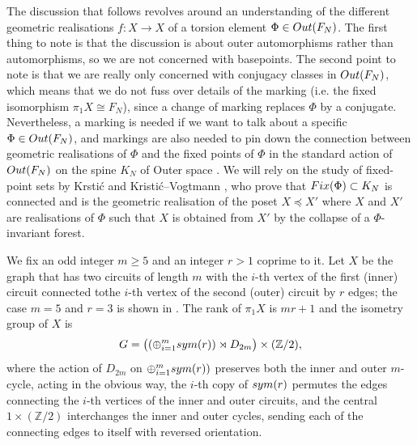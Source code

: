 \documentclass[11pt, a4 paper]{amsart}
\numberwithin{equation}{section}
\theoremstyle{remark}
\theoremstyle{definition}
\def\Z{\mathbb Z}
\def\outN{{\rm{Out}}(F_N)}
\def\sym{{\rm{sym}}}
\begin{document}
The discussion that follows revolves around an understanding 
of the different geometric realisations $f:X\to X$
of a torsion element $\Phi\in\outN$. 
The first thing to note is that the discussion is 
about outer automorphisms rather than automorphisms, 
so we are not concerned with basepoints. 
The second point to note is that we are really only concerned 
with conjugacy classes in $\outN$,
which means that we do not fuss over details of the marking 
(i.e. the fixed isomorphism $\pi_1X\cong F_N$), 
since a change of marking replaces $\Phi$ by a conjugate. 
Nevertheless, a marking is needed 
if we want to talk about a specific $\Phi\in\outN$, 
and markings are also needed to pin down 
the connection between geometric realisations of $\Phi$ 
and the fixed points of $\Phi$ 
in the standard action of $\outN$ on the spine $K_N$ 
of Outer space \cite{culler1986moduli}. 
We will rely on the study of fixed-point sets by 
Krsti\'{c} \cite{krstic1989actions} 
and Kristi\'{c}--Vogtmann \cite{krstic1993equivariant}, 
who prove that ${\rm{Fix}}(\Phi)\subset K_N$ is connected 
and is the geometric realisation of the poset $X\preceq X'$ 
where $X$ and $X'$ are realisations of $\Phi$ 
such that $X$ is obtained from $X'$ 
by the collapse of a $\Phi$-invariant forest. 

We fix an odd integer $m\ge 5$ 
and an integer $r>1$ coprime to it. 
Let $X$ be the graph that has two circuits of length $m$ 
with the $i$-th vertex of the first (inner) circuit 
connected tothe $i$-th vertex of the second (outer) circuit 
by $r$ edges; 
the case $m = 5$ and $r = 3$ is shown in . 
The rank of $\pi_1X$ is $mr + 1$ 
and the isometry group of $X$ is 
$$G=\big((
	\oplus_{i=1}^m\sym(r))\rtimes D_{2m}\big) \times (\Z/2),$$
where the action of $D_{2m}$ on $\oplus_{i=1}^m\sym(r))$
preserves both the inner and outer $m$-cycle, 
acting in the obvious way,
the $i$-th copy of $\sym(r)$ 
permutes the edges connecting 
the $i$-th vertices of the inner and outer circuits, 
and the central $1\times (\Z/2)$ 
interchanges the inner and outer cycles, 
sending each of the connecting edges to itself 
with reversed orientation. 
\end{document}

